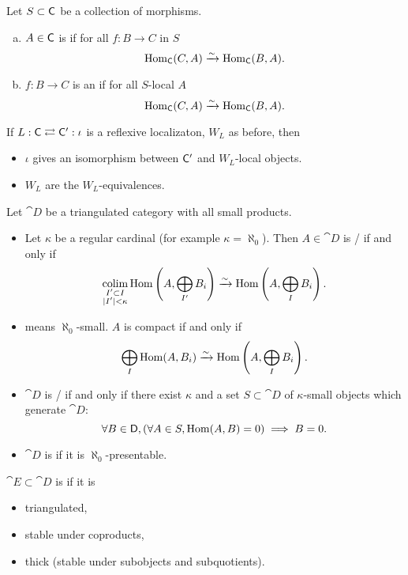 \begin{definition}
	Let $S\subset \mathsf{C}$ be a collection of morphisms.
	\begin{enumerate}[a)]
		\item $A\in \mathsf{C}$ is  if for all $f:B\to C$ in $S$ 
			\[
			\operatorname{Hom}_\mathsf{C}(C,A) \xrightarrow{\sim} \operatorname{Hom}_\mathsf{C}(B,A).
			\] 
		\item $f:B\to C$ is an  if for all $S$-local $A$ 
			\[
			\operatorname{Hom}_{\mathsf{C}}(C,A) \xrightarrow{\sim} \operatorname{Hom}_\mathsf{C}(B,A).
			\] 
	\end{enumerate}
\end{definition}
\begin{lemma}
	If $L:\mathsf{C} \rightleftarrows \mathsf{C}':\iota$ is a reflexive localizaton, $W_L$ as before, then
	\begin{itemize}
		\item $\iota$ gives an isomorphism between $\mathsf{C}'$ and $W_L$-local objects.
		\item $W_L$ are the $W_L$-equivalences.
	\end{itemize}
\end{lemma}
\begin{definition}
	Let $\cat{D}$ be a triangulated category with all small products.
	\begin{itemize}
		\item Let $\kappa$ be a regular cardinal (for example $\kappa=\aleph_0$). Then $A\in \cat{D}$ is / if and only if
			\[
				\operatorname*{colim}_{\substack{I' \subset I \\ |I'|<\kappa}} \operatorname{Hom}\left( A,\bigoplus_{I'}B_i \right) \xrightarrow{\sim} \operatorname{Hom}\left( A, \bigoplus_I B_i \right) 
			.\] 
		\item {} means $\aleph_0$-small. $A$ is compact if and only if
			\[
			\bigoplus_I \operatorname{Hom}(A,B_i) \xrightarrow{\sim} \operatorname{Hom} \left( A,\bigoplus_{I}B_i \right) 
			.\] 
		\item $\cat{D}$ is / if and only if there exist $\kappa$ and a set $S\subset \cat{D}$ of $\kappa$-small objects which generate $\cat{D}$:
			\[
				\forall B\in \mathsf{D},\left( \forall A\in S, \operatorname{Hom}(A,B)=0 \right) \implies B = 0
			.\] 
		\item $\cat{D}$ is  if it is $\aleph_0$-presentable.
	\end{itemize}
\end{definition}

\begin{definition}
	$\cat{E}\subset \cat{D}$ is  if it is
	\begin{itemize}
		\item triangulated,
		\item stable under coproducts,
		\item thick (stable under subobjects and subquotients).
	\end{itemize}
\end{definition}

